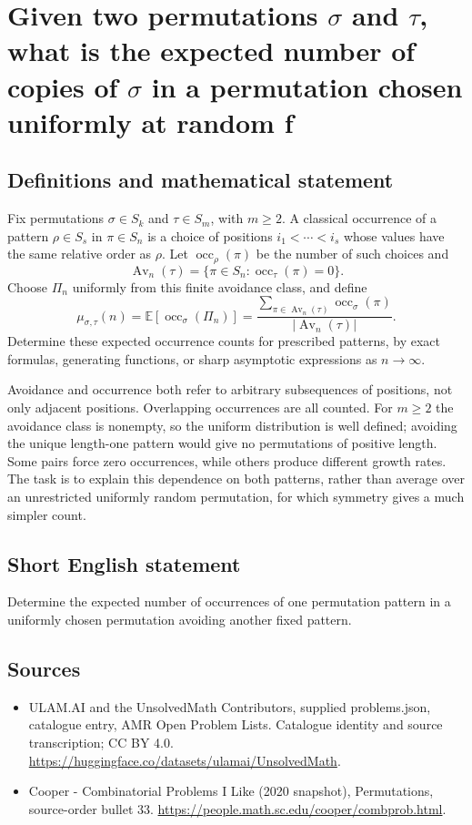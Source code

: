 \documentclass[11pt,a4paper]{article}
\begin{document}
\section*{Given two permutations $\sigma$ and $\tau$, what is the expected number of copies of $\sigma$ in a permutation chosen uniformly at random f}\label{statement}

\subsection{Definitions and mathematical statement}
Fix permutations $\sigma\in S_k$ and $\tau\in S_m$, with $m\ge2$.
A classical occurrence of a pattern $\rho\in S_s$ in
$\pi\in S_n$ is a choice of positions $i_1<\cdots<i_s$ whose
values have the same relative order as $\rho$. Let
$\operatorname{occ}_\rho(\pi)$ be the number of such choices and
\[
 \operatorname{Av}_n(\tau)=
       \{\pi\in S_n:\operatorname{occ}_\tau(\pi)=0\}.
\]
Choose $\Pi_n$ uniformly from this finite avoidance class, and define
\[
 \mu_{\sigma,\tau}(n)
   =\mathbb E[\operatorname{occ}_\sigma(\Pi_n)]
   =\frac{\sum_{\pi\in\operatorname{Av}_n(\tau)}
                       \operatorname{occ}_\sigma(\pi)}
          {|\operatorname{Av}_n(\tau)|}.
\]
Determine these expected occurrence counts for prescribed patterns,
by exact formulas, generating functions, or sharp asymptotic
expressions as $n\to\infty$.

Avoidance and occurrence both refer to arbitrary subsequences of
positions, not only adjacent positions. Overlapping occurrences
are all counted. For $m\ge2$ the avoidance class is nonempty, so
the uniform distribution is well defined; avoiding the unique
length-one pattern would give no permutations of positive length.
Some pairs force zero occurrences, while others produce different
growth rates. The task is to explain this dependence on both
patterns, rather than average over an unrestricted uniformly
random permutation, for which symmetry gives a much simpler count.
\subsection{Short English statement}
Determine the expected number of occurrences of one permutation pattern in a uniformly chosen permutation avoiding another fixed pattern.
\subsection{Sources}
\begin{itemize}
\item[S1] ULAM.AI and the UnsolvedMath Contributors, supplied problems.json, catalogue entry, AMR Open Problem Lists. Catalogue identity and source transcription; CC BY 4.0.
\url{https://huggingface.co/datasets/ulamai/UnsolvedMath}.
\item[S2] Cooper - Combinatorial Problems I Like (2020 snapshot), Permutations, source-order bullet 33. 
\url{https://people.math.sc.edu/cooper/combprob.html}.
\end{itemize}
\end{document}
